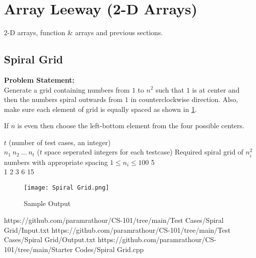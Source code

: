\section{Array Leeway (2-D Arrays)}
\begin{topics}
2-D arrays, function \& arrays and previous sections.
\end{topics}
\subsection{Spiral Grid}
\textbf{Problem Statement:}\\
Generate a grid containing numbers from $1$ to $n^2$ such that $1$ is at center and then the numbers spiral outwards from $1$ in counterclockwise direction. Also, make sure each element of grid is equally spaced as shown in \ref{fig:spiralgrid}.
\begin{note}
	If $n$ is even then choose the left-bottom element from the four possible centers.
\end{note}
\begin{comment}
	\begin{figure}[H]
		\centering
		\begin{subfigure}{0.4\linewidth}
			\centering
			\begin{tabular}{rrrr}
			16 & 15 & 14 & 13 \\
			5  & 4  & 3  & 12 \\
			6  & 1  & 2  & 11 \\
			7  & 8  & 9  & 10
			\end{tabular}
			\caption{$n=4$}
		\end{subfigure}
		\begin{subfigure}{0.4\linewidth}
			\centering
			\begin{tabular}{rrrrr}
			17 & 16 & 15 & 14 & 13 \\
			18 & 5  & 4  & 3  & 12 \\
			19 & 6  & 1  & 2  & 11 \\
			20 & 7  & 8  & 9  & 10 \\
			21 & 22 & 23 & 24 & 25
			\end{tabular}
			\caption{$n=5$}
		\end{subfigure}
		\caption{Spiral Grid}
		\label{fig:spiralgrid}
	\end{figure}
\end{comment}
\begin{testcasesMore}
	{$t$ \hfill(number of test cases, an integer)\\$n_1\ n_2\ \ldots\ n_t$ \hfill($t$ space seperated integers for each testcase)}
	{Required spiral grid of $n_i^2$ numbers with appropriate spacing}
	{$1 \leq n_i \leq 100$}
	{5\\1 2 3 6 15}
	{\vspace{-2em}\begin{figure}[H]
		\texttt{[image: Spiral Grid.png]}
		\caption{Sample Output}
		\label{fig:spiralgrid}
	\end{figure}
	}
	{https://github.com/paramrathour/CS-101/tree/main/Test Cases/Spiral Grid/Input.txt}
	{https://github.com/paramrathour/CS-101/tree/main/Test Cases/Spiral Grid/Output.txt}
	{https://github.com/paramrathour/CS-101/tree/main/Starter Codes/Spiral Grid.cpp}
\end{testcasesMore}
